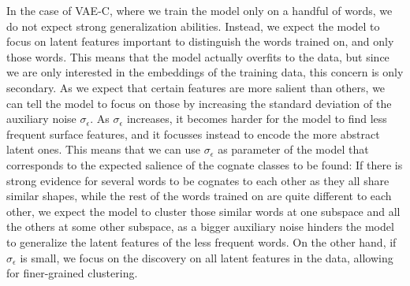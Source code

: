\documentclass[6pt]{article}
\begin{document}
In the case of VAE-C, where we train the model only on a handful of words, we do not expect strong generalization abilities. Instead, we expect the model to focus on latent features important to distinguish the words trained on, and only those words. This means that the model actually overfits to the data, but since we are only interested in the embeddings of the training data, this concern is only secondary. As we expect that certain features are more salient than others, we can tell the model to focus on those by increasing the standard deviation of the auxiliary noise $\sigma_{\epsilon}$. As $\sigma_{\epsilon}$ increases, it becomes harder for the model to find less frequent surface features, and it focusses instead to encode the more abstract latent ones. This means that we can use $\sigma_{\epsilon}$ as parameter of the model that corresponds to the expected salience of the cognate classes to be found: If there is strong evidence for several words to be cognates to each other as they all share similar shapes, while the rest of the words trained on are quite different to each other, we expect the model to cluster those similar words at one subspace and all the others at some other subspace, as a bigger auxiliary noise hinders the model to generalize the latent features of the less frequent words. On the other hand, if  $\sigma_{\epsilon}$  is small, we focus on the discovery on all latent features in the data, allowing for finer-grained clustering.  
\end{document}
